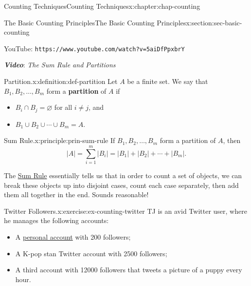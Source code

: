 \documentclass[oneside,10pt,]{book}
\newcommand{\mono}[1]{\texttt{#1}}
\newcommand{\alert}[1]{\textbf{\textit{#1}}}
\newcommand{\terminology}[1]{\textbf{#1}}
\numberwithin{equation}{section}
\newlength{\qrsize}
\newlength{\previewwidth}
\begin{document}
\begin{chapterptx}{Counting Techniques}{}{Counting Techniques}{}{}{x:chapter:chap-counting}
\begin{sectionptx}{The Basic Counting Principles}{}{The Basic Counting Principles}{}{}{x:section:sec-basic-counting}
\begin{sidebyside}{1}{0}{0}{0}
\begin{sbspanel}{1}
\begin{tcbraster}[raster columns=2, raster column skip=1pt, raster halign=center, raster force size=false, raster left skip=0pt, raster right skip=0pt]
\begin{tcolorbox}[previewstyle, width=\previewwidth]
\end{tcolorbox}%
\begin{tcolorbox}[qrstyle]%
{\hypersetup{urlcolor=black}}%
\end{tcolorbox}%
\begin{tcolorbox}[captionstyle]%
\small YouTube: \mono{https://www.youtube.com/watch?v=5aiDfPpxbrY}\end{tcolorbox}%
\end{tcbraster}%
\end{sbspanel}%
\end{sidebyside}%
\par
\alert{Video}: \emph{The Sum Rule and Partitions}%
\begin{definition}{Partition.}{x:definition:def-partition}%
Let \(A\) be a finite set. We say that \(B_1,B_2,\ldots,B_m\) form a \terminology{partition} of \(A\) if%
\begin{itemize}[label=\textbullet]
\item{}\(B_i \cap B_j = \varnothing\) for all \(i \ne j\), and%
\item{}\(B_1 \cup B_2 \cup \cdots \cup B_m = A\).%
\end{itemize}
%
\end{definition}
\begin{principle}{Sum Rule.}{}{x:principle:prin-sum-rule}%
If \(B_1,B_2,\ldots,B_m\) form a partition of \(A\), then%
\begin{equation*}
|A| = \sum_{i=1}^m |B_i| = |B_1| + |B_2| + \cdots + |B_m|\text{.}
\end{equation*}
%
\end{principle}
The \hyperref[x:principle:prin-sum-rule]{Sum Rule} essentially tells us that in order to count a set of objects, we can break these objects up into disjoint cases, count each case separately, then add them all together in the end. Sounds reasonable!%
\begin{inlineexercise}{Twitter Followers.}{x:exercise:ex-counting-twitter}%
TJ is an avid Twitter user, where he manages the following accounts:%
\begin{itemize}[label=\textbullet]
\item{}A \href{https://twitter.com/tjyusun}{personal account} with 200 followers;%
\item{}A K-pop stan Twitter account with 2500 followers;%
\item{}A third account with 12000 followers that tweets a picture of a puppy every hour.%
\end{itemize}

\end{inlineexercise}
\end{sectionptx}
\end{chapterptx}
\end{document}
